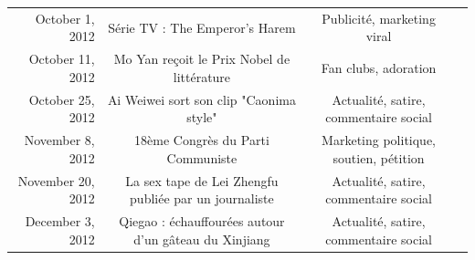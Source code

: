 \begin{landscape}
\begin{table}
\begin{tabulary}{\linewidth}{ r| C C C}
        October 1, 2012 &
        Série TV : The Emperor's Harem & 
        Publicité, marketing viral &
         \\

        October 11, 2012  &
        Mo Yan reçoit le Prix Nobel de littérature &
        Fan clubs, adoration  &
         \\

        October 25, 2012 &
        Ai Weiwei sort son clip "Caonima style"&
        Actualité, satire, commentaire social &
        \\

        November 8, 2012 &
        18ème Congrès du Parti Communiste &
        Marketing politique, soutien, pétition &
        \\

        November 20, 2012 &
        La sex tape de Lei Zhengfu publiée par un journaliste &
        Actualité, satire, commentaire social &
        \\

        December 3, 2012  &
        Qiegao : échauffourées autour d'un gâteau du Xinjiang &
        Actualité, satire, commentaire social &
        \\

    \end{tabulary}
\end{table}
\end{landscape}